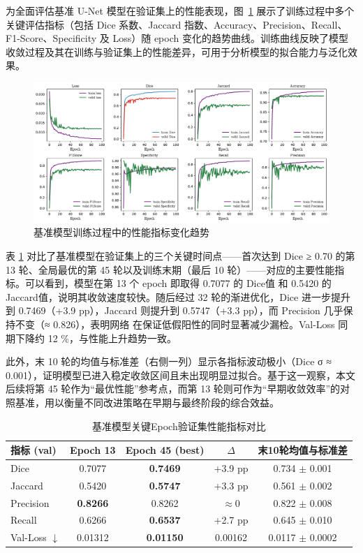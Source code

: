 为全面评估基准 U-Net 模型在验证集上的性能表现，图~\ref{fig:base_unet_metrics} 展示了训练过程中多个关键评估指标（包括 Dice 系数、Jaccard 指数、Accuracy、Precision、Recall、F1-Score、Specificity 及 Loss）随 epoch 变化的趋势曲线。训练曲线反映了模型收敛过程及其在训练与验证集上的性能差异，可用于分析模型的拟合能力与泛化效果。

\begin{figure}[!htbp]
    \centering
    \includegraphics[width=\textwidth]{fig/base_unet_metrics.pdf}
    \caption{基准模型训练过程中的性能指标变化趋势}
    \label{fig:base_unet_metrics}
\end{figure}

表 \ref{tab:unet_epoch_compare} 对比了基准模型在验证集上的三个关键时间点——首次达到 Dice ≥ 0.70 的第 13 轮、全局最优的第 45 轮以及训练末期（最后 10 轮）——对应的主要性能指标。可以看到，模型在第 13 个 epoch 即取得 0.7077 的 Dice值 和 0.5420 的 Jaccard值，说明其收敛速度较快。随后经过 32 轮的渐进优化，Dice 进一步提升到 0.7469（+3.9 pp），Jaccard 则提升到 0.5747（+3.3 pp），而 Precision 几乎保持不变（≈ 0.826），表明网络 在保证低假阳性的同时显著减少漏检。Val-Loss 同期下降约 12 \%，与性能上升趋势一致。

此外，末 10 轮的均值与标准差（右侧一列）显示各指标波动极小（Dice σ ≈ 0.001），证明模型已进入稳定收敛区间且未出现明显过拟合。基于这一观察，本文后续将第 45 轮作为“最优性能”参考点，而第 13 轮则可作为“早期收敛效率”的对照基准，用以衡量不同改进策略在早期与最终阶段的综合效益。

\begin{table}[htbp]
    \centering
    \caption{基准模型关键Epoch验证集性能指标对比}
    \label{tab:unet_epoch_compare}
    \begin{tabular}{lcccc}
        \toprule
        指标 (val) & Epoch 13 & Epoch 45 (best) & $\Delta$ & 末10轮均值与标准差 \\
        \midrule
        Dice        & 0.7077 & \textbf{0.7469} & +3.9 pp   & 0.734 $\pm$ 0.001 \\
        Jaccard     & 0.5420 & \textbf{0.5747} & +3.3 pp   & 0.561 $\pm$ 0.002 \\
        Precision   & \textbf{0.8266} & 0.8262 & $\approx$0 & 0.822 $\pm$ 0.008 \\
        Recall      & 0.6266 & \textbf{0.6537} & +2.7 pp   & 0.645 $\pm$ 0.010 \\
        Val-Loss $\downarrow$ & 0.01312 & \textbf{0.01150} & 0.00162 & 0.0117 $\pm$ 0.0002 \\
        \bottomrule
    \end{tabular}
\end{table}

